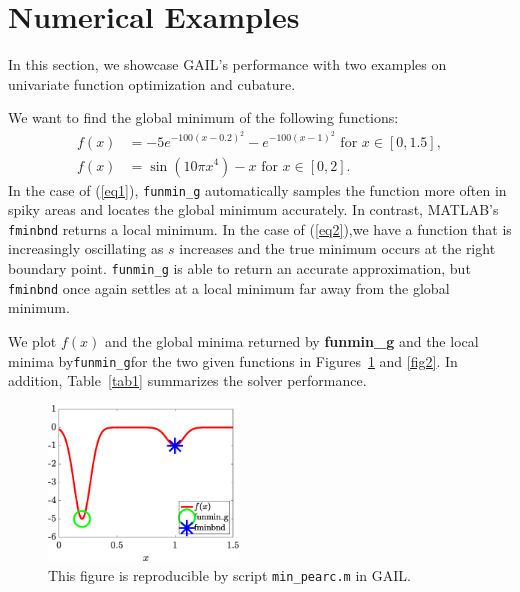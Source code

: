 \section{Numerical Examples}
\label{sec:ex}

In this section, we showcase GAIL's performance with two examples on
univariate function optimization and cubature.

\begin{example} We want to find the global minimum of the following functions: 
\begin{align}
    f(x) &= -5 e^{-100(x-0.2)^2}-e^{ -100(x-1)^2}  \mbox{ for } x \in [0, 1.5], \label{eq1}
\\ f(x) &= \sin (10 \pi x^4 ) - x  \mbox{ for } x \in [0, 2]. \label{eq2}
\end{align}
In the case of (\ref{eq1}), \texttt{funmin\_g} automatically samples the
function more often in spiky areas and locates the global minimum
accurately. In contrast, MATLAB's \texttt{fminbnd} returns a local minimum.
In the case of (\ref{eq2}),we have a function that is increasingly
oscillating as $s$ increases and the true minimum occurs at the right
boundary point. \texttt{funmin\_g} is able to return an accurate
approximation, but \texttt{fminbnd} once again settles at a local minimum
far away from the global minimum.

We plot $f(x)$ and the global minima returned by \textbf{funmin\_g} and the
local minima by\texttt{funmin\_g}for the two given functions in
Figures~\ref{fig1} and \ref{fig2}. In addition, Table~\ref{tab1} summarizes the 
solver performance.

\begin{figure} %
\centering
\includegraphics[width = 0.45\textwidth]{humps.eps} 
\caption{
This figure is reproducible by script \texttt{min\_pearc.m} in GAIL.}\label{fig1}
\end{figure}


\end{example}
